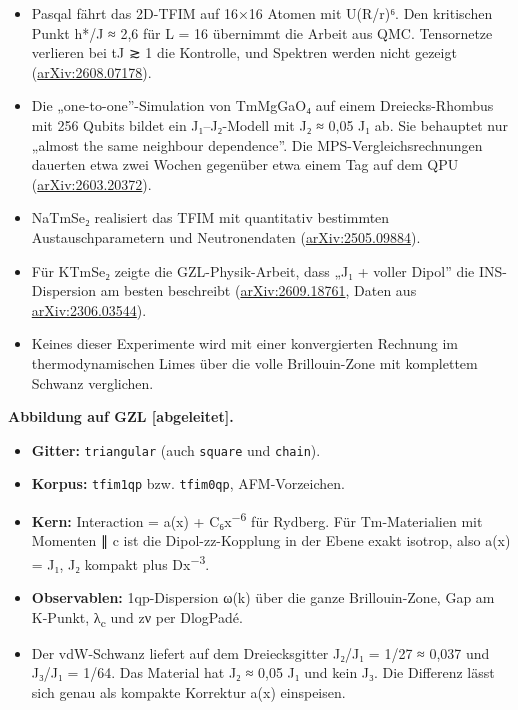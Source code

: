 \begin{itemize}
\tightlist
\item
  Pasqal fährt das 2D-TFIM auf 16×16 Atomen mit U(R/r)⁶. Den kritischen Punkt h*/J ≈ 2,6 für L = 16 übernimmt die Arbeit aus QMC. Tensornetze verlieren bei tJ ≳ 1 die Kontrolle, und Spektren werden nicht gezeigt (\href{https://arxiv.org/abs/2608.07178}{arXiv:2608.07178}).
\item
  Die „one-to-one''-Simulation von TmMgGaO₄ auf einem Dreiecks-Rhombus mit 256 Qubits bildet ein J₁--J₂-Modell mit J₂ ≈ 0,05 J₁ ab. Sie behauptet nur „almost the same neighbour dependence''. Die MPS-Vergleichsrechnungen dauerten etwa zwei Wochen gegenüber etwa einem Tag auf dem QPU (\href{https://arxiv.org/abs/2603.20372}{arXiv:2603.20372}).
\item
  NaTmSe₂ realisiert das TFIM mit quantitativ bestimmten Austauschparametern und Neutronendaten (\href{https://arxiv.org/abs/2505.09884}{arXiv:2505.09884}).
\item
  Für KTmSe₂ zeigte die GZL-Physik-Arbeit, dass „J₁ + voller Dipol'' die INS-Dispersion am besten beschreibt (\href{https://arxiv.org/html/2609.18761}{arXiv:2609.18761}, Daten aus \href{https://arxiv.org/abs/2306.03544}{arXiv:2306.03544}).
\item
  Keines dieser Experimente wird mit einer konvergierten Rechnung im thermodynamischen Limes über die volle Brillouin-Zone mit komplettem Schwanz verglichen.
\end{itemize}

\textbf{Abbildung auf GZL {[}abgeleitet{]}.}

\begin{itemize}
\tightlist
\item
  \textbf{Gitter:} \texttt{triangular} (auch \texttt{square} und \texttt{chain}).
\item
  \textbf{Korpus:} \texttt{tfim1qp} bzw. \texttt{tfim0qp}, AFM-Vorzeichen.
\item
  \textbf{Kern:} Interaction = a(x) + C₆\textbar x\textbar{}\textsuperscript{−6} für Rydberg. Für Tm-Materialien mit Momenten ∥ c ist die Dipol-zz-Kopplung in der Ebene exakt isotrop, also a(x) = J₁, J₂ kompakt plus D\textbar x\textbar{}\textsuperscript{−3}.
\item
  \textbf{Observablen:} 1qp-Dispersion ω(k) über die ganze Brillouin-Zone, Gap am K-Punkt, λ\textsubscript{c} und zν per DlogPadé.
\item
  Der vdW-Schwanz liefert auf dem Dreiecksgitter J₂/J₁ = 1/27 ≈ 0,037 und J₃/J₁ = 1/64. Das Material hat J₂ ≈ 0,05 J₁ und kein J₃. Die Differenz lässt sich genau als kompakte Korrektur a(x) einspeisen.
\end{itemize}

